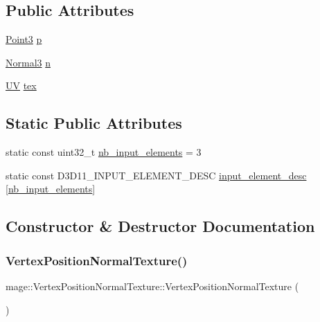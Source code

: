 \subsection*{Public Attributes}
\begin{DoxyCompactItemize}
\item 
\hyperlink{structmage_1_1_point3}{Point3} \hyperlink{structmage_1_1_vertex_position_normal_texture_a9000b80274027dd7b7d258f45523ca65}{p}
\item 
\hyperlink{structmage_1_1_normal3}{Normal3} \hyperlink{structmage_1_1_vertex_position_normal_texture_a442eb1609ab596e3e33c26f7be32695a}{n}
\item 
\hyperlink{structmage_1_1_u_v}{UV} \hyperlink{structmage_1_1_vertex_position_normal_texture_a0782e41c5e28d421bfb47afad9af9c55}{tex}
\end{DoxyCompactItemize}
\subsection*{Static Public Attributes}
\begin{DoxyCompactItemize}
\item 
static const uint32\+\_\+t \hyperlink{structmage_1_1_vertex_position_normal_texture_ae4e7cf708af3f123450ec65a68e21584}{nb\+\_\+input\+\_\+elements} = 3
\item 
static const D3\+D11\+\_\+\+I\+N\+P\+U\+T\+\_\+\+E\+L\+E\+M\+E\+N\+T\+\_\+\+D\+E\+SC \hyperlink{structmage_1_1_vertex_position_normal_texture_a4e6f650ee5968c6dc873e8e41dae5395}{input\+\_\+element\+\_\+desc} \mbox{[}\hyperlink{structmage_1_1_vertex_position_normal_texture_ae4e7cf708af3f123450ec65a68e21584}{nb\+\_\+input\+\_\+elements}\mbox{]}
\end{DoxyCompactItemize}


\subsection{Constructor \& Destructor Documentation}
\hypertarget{structmage_1_1_vertex_position_normal_texture_a05158b4e9daf54137a2b8fba80890034}{}\label{structmage_1_1_vertex_position_normal_texture_a05158b4e9daf54137a2b8fba80890034} 
\subsubsection{\texorpdfstring{Vertex\+Position\+Normal\+Texture()}{VertexPositionNormalTexture()}\hspace{0.1cm}{\footnotesize\ttfamily [1/3]}}
{\footnotesize\ttfamily mage\+::\+Vertex\+Position\+Normal\+Texture\+::\+Vertex\+Position\+Normal\+Texture (\begin{DoxyParamCaption}{ }\end{DoxyParamCaption})\hspace{0.3cm}{\ttfamily [default]}}

